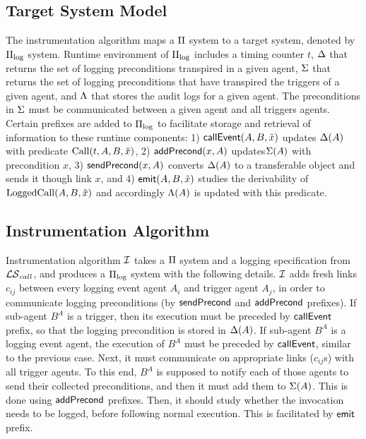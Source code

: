\subsection{Target System Model} \label{sec:pi-log}
The instrumentation algorithm maps a $\Pi$ system to a target system, denoted by $\Pi_{\mathrm{log}}$ system. Runtime environment of $\Pi_{\mathrm{log}}$ includes a timing counter $t$, $\Delta$ that returns the set of logging preconditions transpired in a given agent, $\Sigma$ that returns the set of logging preconditions that have transpired the triggers of a given agent, and $\Lambda$ that stores the audit logs for a given agent. The preconditions in $\Sigma$ must be communicated between a given agent and all triggers agents. Certain prefixes are added to $\Pi_{\mathrm{log}}$ to facilitate storage and retrieval of information to these runtime components: 1) $\mathsf{callEvent}(A,B,\tilde{x})$ updates $\Delta(A)$ with predicate $\mathrm{Call}(t,A,B,\tilde{x})$, 2) $\mathsf{addPrecond}(x,A)$ updates$\Sigma(A)$ with precondition $x$, 3) $\mathsf{sendPrecond}(x,A)$ converts $\Delta(A)$ to a transferable object and sends it though link $x$, and 4) $\mathsf{emit}(A,B,\tilde{x})$ studies the derivability of $\mathrm{LoggedCall}(A,B,\tilde{x})$ and accordingly $\Lambda(A)$ is updated with this predicate. 


\subsection{Instrumentation Algorithm} \label{sec:inst-alg}
Instrumentation algorithm $\mathcal{I}$ takes a $\Pi$ system and a logging specification from ${\mathcal{LS}_{\mathit{call}}}$, and produces a $\Pi_{\mathrm{log}}$ system with the following details. $\mathcal{I}$ adds fresh links $c_{ij}$ between every logging event agent $A_i$ and trigger agent $A_j$, in order to communicate logging preconditions (by $\mathsf{sendPrecond}$ and $\mathsf{addPrecond}$ prefixes). If sub-agent $B^A$ is a trigger, then its execution must be preceded by $\mathsf{callEvent}$ prefix, so that the logging precondition is stored in $\Delta(A)$. If sub-agent $B^A$ is a logging event agent, the execution of $B^A$ must be preceded by $\mathsf{callEvent}$, similar to the previous case. Next, it must communicate on appropriate links ($c_{ij}$s) with all trigger agents. To this end, $B^A$ is supposed to notify each of those agents to send their collected preconditions, and then it must add them to $\Sigma(A)$. This is done using $\mathsf{addPrecond}$ prefixes. Then, it should study whether the invocation needs to be logged, before following normal execution. This is facilitated by $\mathsf{emit}$ prefix. 

